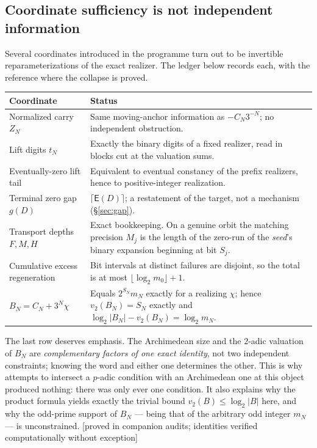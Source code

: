 \documentclass[11pt]{article}
\theoremstyle{plain}
\theoremstyle{definition}
\theoremstyle{remark}
\newcommand{\Edep}{\mathsf{E}}          %
\newcommand{\status}[1]{\textsf{\footnotesize[#1]}}
\begin{document}
\subsection{Coordinate sufficiency is not independent information}\label{sec:collapse}

Several coordinates introduced in the programme turn out to be invertible reparameterizations of
the exact realizer. The ledger below records each, with the reference where the collapse is proved.

\begin{center}
\small
\begin{tabular}{@{}p{}p{}@{}}
\toprule
Coordinate & Status \\
\midrule
Normalized carry $Z_N$ & Same moving-anchor information as $-C_N3^{-N}$; no independent obstruction. \\
Lift digits $t_N$ & Exactly the binary digits of a fixed realizer, read in blocks cut at the valuation sums. \\
Eventually-zero lift tail & Equivalent to eventual constancy of the prefix realizers, hence to positive-integer realization. \\
Terminal zero gap $g(D)$ & $\lceil \Edep(D)\rceil$; a restatement of the target, not a mechanism (\S\ref{sec:gap}). \\
Transport depths $F,M,H$ & Exact bookkeeping. On a genuine orbit the matching precision $M_j$ is the length of the zero-run of the \emph{seed}'s binary expansion beginning at bit $S_j$. \\
Cumulative excess regeneration & Bit intervals at distinct failures are disjoint, so the total is at most $\lfloor\log_2 m_0\rfloor+1$. \\
$B_N=C_N+3^N\chi$ & Equals $2^{S_N}m_N$ exactly for a realizing $\chi$; hence $v_2(B_N)=S_N$ exactly and $\log_2|B_N|-v_2(B_N)=\log_2 m_N$. \\
\bottomrule
\end{tabular}
\end{center}

The last row deserves emphasis. The Archimedean size and the $2$-adic valuation of $B_N$ are
\emph{complementary factors of one exact identity}, not two independent constraints; knowing the
word and either one determines the other. This is why attempts to intersect a $p$-adic condition
with an Archimedean one at this object produced nothing: there was only ever one condition. It also
explains why the product formula yields exactly the trivial bound $v_2(B)\le\log_2|B|$ here, and
why the odd-prime support of $B_N$ --- being that of the arbitrary odd integer $m_N$ --- is
unconstrained. \status{proved in companion audits; identities verified computationally without
exception}
\end{document}
